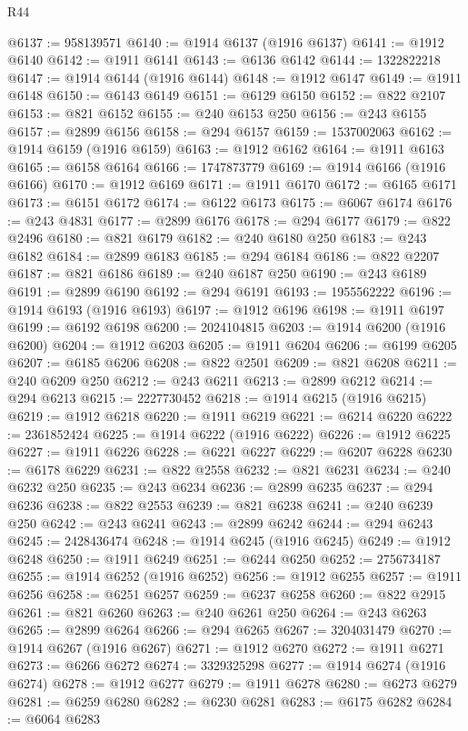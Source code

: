 \begin{lexlean}{R44}
\begin{coremodule}
{@6137 := 958139571
@6140 := @1914 @6137 (@1916 @6137)
@6141 := @1912 @6140
@6142 := @1911 @6141
@6143 := @6136 @6142
@6144 := 1322822218
@6147 := @1914 @6144 (@1916 @6144)
@6148 := @1912 @6147
@6149 := @1911 @6148
@6150 := @6143 @6149
@6151 := @6129 @6150
@6152 := @822 @2107
@6153 := @821 @6152
@6155 := @240 @6153 @250
@6156 := @243 @6155
@6157 := @2899 @6156
@6158 := @294 @6157
@6159 := 1537002063
@6162 := @1914 @6159 (@1916 @6159)
@6163 := @1912 @6162
@6164 := @1911 @6163
@6165 := @6158 @6164
@6166 := 1747873779
@6169 := @1914 @6166 (@1916 @6166)
@6170 := @1912 @6169
@6171 := @1911 @6170
@6172 := @6165 @6171
@6173 := @6151 @6172
@6174 := @6122 @6173
@6175 := @6067 @6174
@6176 := @243 @4831
@6177 := @2899 @6176
@6178 := @294 @6177
@6179 := @822 @2496
@6180 := @821 @6179
@6182 := @240 @6180 @250
@6183 := @243 @6182
@6184 := @2899 @6183
@6185 := @294 @6184
@6186 := @822 @2207
@6187 := @821 @6186
@6189 := @240 @6187 @250
@6190 := @243 @6189
@6191 := @2899 @6190
@6192 := @294 @6191
@6193 := 1955562222
@6196 := @1914 @6193 (@1916 @6193)
@6197 := @1912 @6196
@6198 := @1911 @6197
@6199 := @6192 @6198
@6200 := 2024104815
@6203 := @1914 @6200 (@1916 @6200)
@6204 := @1912 @6203
@6205 := @1911 @6204
@6206 := @6199 @6205
@6207 := @6185 @6206
@6208 := @822 @2501
@6209 := @821 @6208
@6211 := @240 @6209 @250
@6212 := @243 @6211
@6213 := @2899 @6212
@6214 := @294 @6213
@6215 := 2227730452
@6218 := @1914 @6215 (@1916 @6215)
@6219 := @1912 @6218
@6220 := @1911 @6219
@6221 := @6214 @6220
@6222 := 2361852424
@6225 := @1914 @6222 (@1916 @6222)
@6226 := @1912 @6225
@6227 := @1911 @6226
@6228 := @6221 @6227
@6229 := @6207 @6228
@6230 := @6178 @6229
@6231 := @822 @2558
@6232 := @821 @6231
@6234 := @240 @6232 @250
@6235 := @243 @6234
@6236 := @2899 @6235
@6237 := @294 @6236
@6238 := @822 @2553
@6239 := @821 @6238
@6241 := @240 @6239 @250
@6242 := @243 @6241
@6243 := @2899 @6242
@6244 := @294 @6243
@6245 := 2428436474
@6248 := @1914 @6245 (@1916 @6245)
@6249 := @1912 @6248
@6250 := @1911 @6249
@6251 := @6244 @6250
@6252 := 2756734187
@6255 := @1914 @6252 (@1916 @6252)
@6256 := @1912 @6255
@6257 := @1911 @6256
@6258 := @6251 @6257
@6259 := @6237 @6258
@6260 := @822 @2915
@6261 := @821 @6260
@6263 := @240 @6261 @250
@6264 := @243 @6263
@6265 := @2899 @6264
@6266 := @294 @6265
@6267 := 3204031479
@6270 := @1914 @6267 (@1916 @6267)
@6271 := @1912 @6270
@6272 := @1911 @6271
@6273 := @6266 @6272
@6274 := 3329325298
@6277 := @1914 @6274 (@1916 @6274)
@6278 := @1912 @6277
@6279 := @1911 @6278
@6280 := @6273 @6279
@6281 := @6259 @6280
@6282 := @6230 @6281
@6283 := @6175 @6282
@6284 := @6064 @6283
}
\end{coremodule}
\end{lexlean}
